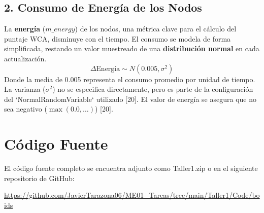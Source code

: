 \documentclass{article}
\begin{document}
\subsection*{2. Consumo de Energía de los Nodos}
La \textbf{energía} ($m\_energy$) de los nodos, una métrica clave para el cálculo del puntaje WCA, disminuye con el tiempo. El consumo se modela de forma simplificada, restando un valor muestreado de una \textbf{distribución normal} en cada actualización.
\begin{equation*}
    \Delta \text{Energía} \sim N(0.005, \sigma^2)
\end{equation*}
Donde la media de 0.005 representa el consumo promedio por unidad de tiempo. La varianza ($\sigma^2$) no se especifica directamente, pero es parte de la configuración del `NormalRandomVariable` utilizado [20]. El valor de energía se asegura que no sea negativo ($\max(0.0, \dots)$) [20].


\section{Código Fuente}\label{sec:cod}

El código fuente completo se encuentra adjunto como Taller1.zip
o en el siguiente repositorio de GitHub:

\begin{center}
\url{https://github.com/JavierTarazona06/ME01_Tareas/tree/main/Taller1/Code/boids}
\end{center}
\end{document}
